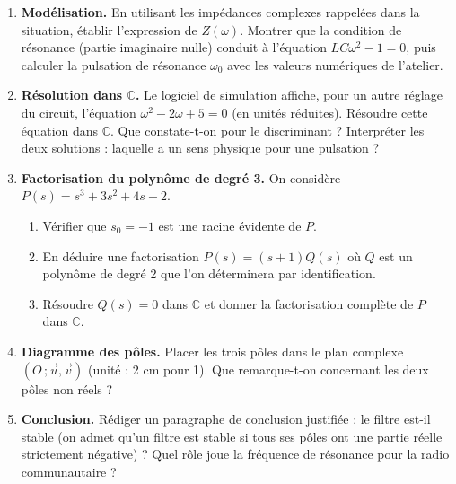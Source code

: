 \documentclass[11pt]{article}
\newcounter{popsec}
\newcounter{popsub}
\newcommand{\courssub}[1]{%
  \stepcounter{popsub}%
  \par\vspace{9pt}\noindent{\popxbold\fontsize{11.5}{13}\selectfont\color{popink}{\color{poporange}\thepopsec.\thepopsub}\hspace{6pt}#1}\par\nopagebreak\vspace{4pt}
}
\begin{document}
\begin{enumerate}
\item \textbf{Modélisation.} En utilisant les impédances complexes rappelées dans la situation, établir l'expression de $Z(\omega)$. Montrer que la condition de résonance (partie imaginaire nulle) conduit à l'équation $LC\omega^2 - 1 = 0$, puis calculer la pulsation de résonance $\omega_0$ avec les valeurs numériques de l'atelier.
\item \textbf{Résolution dans $\mathbb{C}$.} Le logiciel de simulation affiche, pour un autre réglage du circuit, l'équation $\omega^2 - 2\omega + 5 = 0$ (en unités réduites). Résoudre cette équation dans $\mathbb{C}$. Que constate-t-on pour le discriminant ? Interpréter les deux solutions : laquelle a un sens physique pour une pulsation ?
\item \textbf{Factorisation du polynôme de degré 3.} On considère $P(s) = s^3 + 3s^2 + 4s + 2$.
\begin{enumerate}
\item Vérifier que $s_0 = -1$ est une racine évidente de $P$.
\item En déduire une factorisation $P(s) = (s+1)Q(s)$ où $Q$ est un polynôme de degré 2 que l'on déterminera par identification.
\item Résoudre $Q(s) = 0$ dans $\mathbb{C}$ et donner la factorisation complète de $P$ dans $\mathbb{C}$.
\end{enumerate}
\item \textbf{Diagramme des pôles.} Placer les trois pôles dans le plan complexe $(O\,;\vec{u},\vec{v})$ (unité : 2 cm pour 1). Que remarque-t-on concernant les deux pôles non réels ?
\item \textbf{Conclusion.} Rédiger un paragraphe de conclusion justifiée : le filtre est-il stable (on admet qu'un filtre est stable si tous ses pôles ont une partie réelle strictement négative) ? Quel rôle joue la fréquence de résonance pour la radio communautaire ?
\end{enumerate}

\courssub{Ressources à mobiliser}
\end{document}
